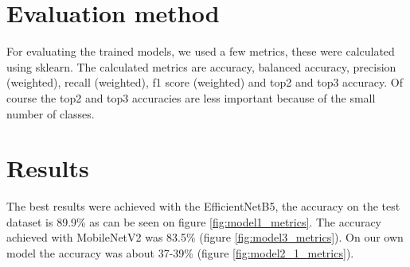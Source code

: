 \documentclass[twocolumn]{article}
\begin{document}
	\section{Evaluation method}
	For evaluating the trained models, we used a few metrics, these were calculated using sklearn. The calculated metrics are accuracy, balanced accuracy, precision (weighted), recall (weighted), f1 score (weighted) and top2 and top3 accuracy. Of course the top2 and top3 accuracies are less important because of the small number of classes.
	
	\section{Results}
	The best results were achieved with the EfficientNetB5, the accuracy on the test dataset is 89.9\% as can be seen on figure \ref{fig:model1_metrics}. The accuracy achieved with MobileNetV2 was 83.5\% (figure \ref{fig:model3_metrics}). On our own model the accuracy was about 37-39\% (figure \ref{fig:model2_1_metrics}).
	
\end{document}
